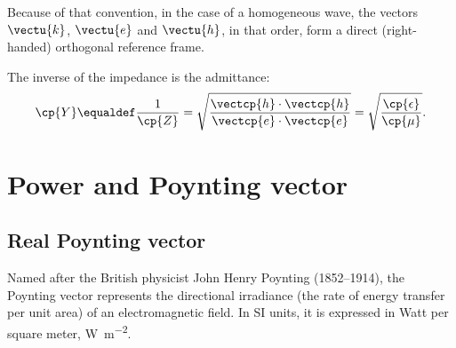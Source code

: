 Because of that convention, in the case of a homogeneous wave,
the vectors $\vectu{k}$, $\vectu{e}$ and $\vectu{h}$, in that order, form a direct (right-handed) orthogonal reference frame.

The inverse of the impedance is the admittance:
\begin{equation}
    \cp{Y}
    \equaldef
    \frac{1}{\cp{Z}}
    =
    \sqrt{\frac{\vectcp{h} \cdot \vectcp{h}}{\vectcp{e} \cdot \vectcp{e}}}
    =
    \sqrt{\frac{\cp{\epsilon}}{\cp{\mu}}}
    \text{.}
\end{equation}






\FloatBarrier
\section{Power and Poynting vector}
\label{sec:power_and_poynting_vector}

\subsection{Real Poynting vector}
Named after the British physicist John Henry Poynting (1852--1914),
the Poynting vector represents the directional irradiance (the rate of energy transfer per unit area) of an electromagnetic field.
In SI units, it is expressed in Watt per square meter, \si{\watt\per\meter\squared}.

